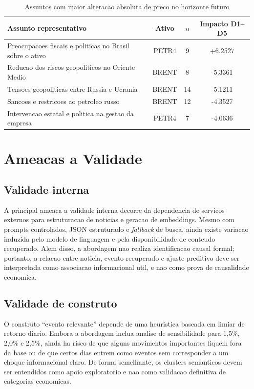 \documentclass[12pt]{article}
\begin{document}
\begin{table}[H]
\centering
\small
\caption{Assuntos com maior alteracao absoluta de preco no horizonte futuro}
\label{tab:topicos_impacto}
\begin{tabular}{l c c c}
\toprule
\textbf{Assunto representativo} & \textbf{Ativo} & \textbf{$n$} & \textbf{Impacto D1--D5} \\
\midrule
Preocupacoes fiscais e politicas no Brasil sobre o ativo & PETR4 & 9 & +6.2527 \\
Reducao dos riscos geopoliticos no Oriente Medio & BRENT & 8 & -5.3361 \\
Tensoes geopoliticas entre Russia e Ucrania & BRENT & 14 & -5.1211 \\
Sancoes e restricoes ao petroleo russo & BRENT & 12 & -4.3527 \\
Intervencao estatal e politica na gestao da empresa & PETR4 & 7 & -4.0636 \\
\bottomrule
\end{tabular}
\end{table}

\section{Ameacas a Validade}

\subsection{Validade interna}

A principal ameaca a validade interna decorre da dependencia de servicos externos para estruturacao de noticias e geracao de embeddings. Mesmo com prompts controlados, JSON estruturado e \textit{fallback} de busca, ainda existe variacao induzida pelo modelo de linguagem e pela disponibilidade de conteudo recuperado. Alem disso, a abordagem nao realiza identificacao causal formal; portanto, a relacao entre noticia, evento recuperado e ajuste preditivo deve ser interpretada como associacao informacional util, e nao como prova de causalidade economica.

\subsection{Validade de construto}

O construto ``evento relevante'' depende de uma heuristica baseada em limiar de retorno diario. Embora a abordagem inclua analise de sensibilidade para 1,5\%, 2,0\% e 2,5\%, ainda ha risco de que alguns movimentos importantes fiquem fora da base ou de que certos dias entrem como eventos sem corresponder a um choque informacional claro. De forma semelhante, os clusters semanticos devem ser entendidos como apoio exploratorio e nao como validacao definitiva de categorias economicas.
\end{document}
